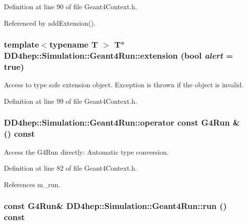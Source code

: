 Definition at line 90 of file Geant4Context.h.

Referenced by addExtension().\hypertarget{class_d_d4hep_1_1_simulation_1_1_geant4_run_aa6fa87e154a0a4f2f550b2d15a457c49}{
\subsubsection[{extension}]{\setlength{\rightskip}{0pt plus 5cm}template$<$typename T $>$ {\bf T}$\ast$ DD4hep::Simulation::Geant4Run::extension (bool {\em alert} = {\ttfamily true})}}
\label{class_d_d4hep_1_1_simulation_1_1_geant4_run_aa6fa87e154a0a4f2f550b2d15a457c49}


Access to type safe extension object. Exception is thrown if the object is invalid. 

Definition at line 99 of file Geant4Context.h.\hypertarget{class_d_d4hep_1_1_simulation_1_1_geant4_run_a635bb2bb80bd8c1933448f6700daf9d7}{
\subsubsection[{operator const G4Run \&}]{\setlength{\rightskip}{0pt plus 5cm}DD4hep::Simulation::Geant4Run::operator const G4Run \& () const}}
\label{class_d_d4hep_1_1_simulation_1_1_geant4_run_a635bb2bb80bd8c1933448f6700daf9d7}


Access the G4Run directly: Automatic type conversion. 

Definition at line 82 of file Geant4Context.h.

References m\_\-run.\hypertarget{class_d_d4hep_1_1_simulation_1_1_geant4_run_a4b60ea2ba284b36a1e76eba1b5379dca}{
\subsubsection[{run}]{\setlength{\rightskip}{0pt plus 5cm}const G4Run\& DD4hep::Simulation::Geant4Run::run () const}}
\label{class_d_d4hep_1_1_simulation_1_1_geant4_run_a4b60ea2ba284b36a1e76eba1b5379dca}


